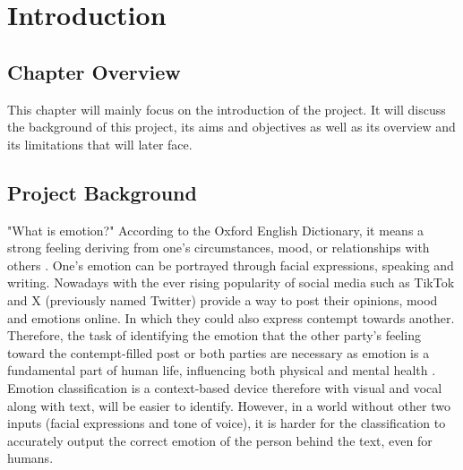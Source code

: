 
\chapter{Introduction}

\singlespaced

\section{Chapter Overview}

This chapter will mainly focus on the introduction of the project. It will discuss the background of this project,
its aims and objectives as well as its overview and its limitations that will later face.

\section{Project Background}

"What is emotion?" According to the Oxford English Dictionary, it means a strong feeling deriving from one's circumstances, mood, or relationships with others \cite{oed:akrasia}.
One's emotion can be portrayed through facial expressions, speaking and writing. 
Nowadays with the ever rising popularity of social media such as TikTok and X (previously named Twitter) provide
a way to post their opinions, mood and emotions online.
In which they could also express contempt towards another.
Therefore, the task of identifying the emotion that the other party's feeling toward the contempt-filled post
or both parties are necessary as emotion is a fundamental part of human life, influencing both physical and mental health \cite{AMEER2023118534}.
Emotion classification is a context-based device therefore with visual and vocal along with text, 
will be easier to identify.
However, in a world without other two inputs (facial expressions and tone of voice), 
it is harder for the classification to accurately output the correct emotion
of the person behind the text, even for humans.

